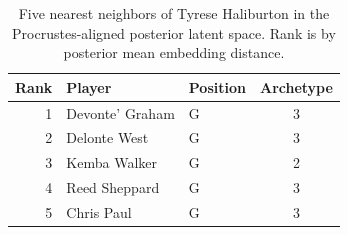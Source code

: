 \begin{table}[htbp]
  \centering\small
  \begin{tabular}{rllc}
    \toprule
    Rank & Player & Position & Archetype \\
    \midrule
    1 & Devonte' Graham & G & 3 \\
    2 & Delonte West & G & 3 \\
    3 & Kemba Walker & G & 2 \\
    4 & Reed Sheppard & G & 3 \\
    5 & Chris Paul & G & 3 \\
    \bottomrule
  \end{tabular}
  \caption{Five nearest neighbors of Tyrese Haliburton in the Procrustes-aligned posterior latent space. Rank is by posterior mean embedding distance.}
  \label{tab:Tyrese_Haliburton_neighbors}
\end{table}


